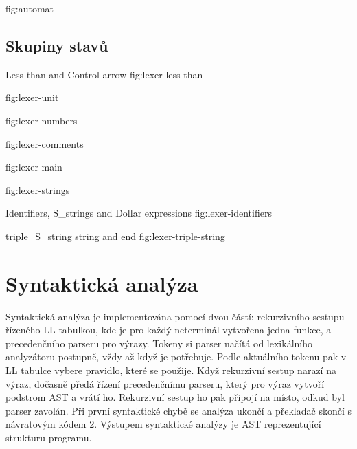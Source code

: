 \documentclass[11pt,a4paper]{article}
\begin{document}
\clearpage
\vspace*{-14mm}
  {fig:automat}

\subsection{Skupiny stavů}
\noindent
\begin{minipage}[t]{.48\linewidth}
    {Less than and Control arrow}
    {fig:lexer-less-than}
\end{minipage}\hfill
\begin{minipage}[t]{.48\linewidth}
    {fig:lexer-unit}
\end{minipage}

  {fig:lexer-numbers}

  {fig:lexer-comments}

  {fig:lexer-main}

  {fig:lexer-strings}

  {Identifiers, S\_strings and Dollar expressions}
  {fig:lexer-identifiers}

  {triple\_S\_string string and end}
  {fig:lexer-triple-string}

\section{Syntaktická analýza}

Syntaktická analýza je implementována pomocí dvou částí: rekurzivního sestupu řízeného LL tabulkou, kde je pro každý neterminál vytvořena jedna funkce, a precedenčního parseru pro výrazy. Tokeny si parser načítá od lexikálního analyzátoru postupně, vždy až když je potřebuje. Podle aktuálního tokenu pak v LL tabulce vybere pravidlo, které se použije. Když rekurzivní sestup narazí na výraz, dočasně předá řízení precedenčnímu parseru, který pro výraz vytvoří podstrom AST a vrátí ho. Rekurzivní sestup ho pak připojí na místo, odkud byl parser zavolán. Při první syntaktické chybě se analýza ukončí a překladač skončí s návratovým kódem 2. Výstupem syntaktické analýzy je AST reprezentující strukturu programu.
\end{document}
